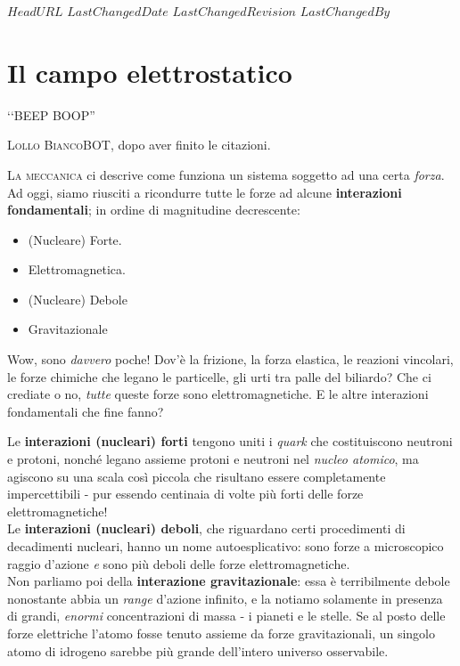 \svnidlong
{$HeadURL$}
{$LastChangedDate$}
{$LastChangedRevision$}
{$LastChangedBy$}

\chapter{Il campo elettrostatico}

\begin{introduction}
‘‘BEEP BOOP''
\begin{flushright}
	\textsc{Lollo BiancoBOT}, dopo aver finito le citazioni. %
\end{flushright}
\end{introduction}
\lettrine[findent=1pt, nindent=0pt]{L}{a meccanica} ci descrive come funziona un sistema soggetto ad una certa \textit{forza}. Ad oggi, siamo riusciti a ricondurre tutte le forze ad alcune \textbf{interazioni fondamentali}; in ordine di magnitudine decrescente:
 \begin{itemize}
 	\item (Nucleare) Forte.
 	\item Elettromagnetica.
 	\item (Nucleare) Debole
 	\item Gravitazionale
 \end{itemize}
 Wow, sono \textit{davvero} poche! Dov'è la frizione, la forza elastica, le reazioni vincolari, le forze chimiche che legano le particelle, gli urti tra palle del biliardo? Che ci crediate o no, \textit{tutte} queste forze sono elettromagnetiche. E le altre interazioni fondamentali che fine fanno?

Le \textbf{interazioni (nucleari) forti} tengono uniti i \textit{quark} che costituiscono neutroni e protoni, nonché legano assieme protoni e neutroni nel \textit{nucleo atomico}, ma agiscono su una scala così piccola che risultano essere completamente impercettibili - pur essendo centinaia di volte più forti delle forze elettromagnetiche!\\
Le \textbf{interazioni (nucleari) deboli}, che riguardano certi procedimenti di decadimenti nucleari, hanno un nome autoesplicativo: sono forze a microscopico raggio d'azione \textit{e} sono più deboli delle forze elettromagnetiche.\\
Non parliamo poi della \textbf{interazione gravitazionale}: essa è terribilmente debole nonostante abbia un \textit{range} d'azione infinito, e la notiamo solamente in presenza di grandi, \textit{enormi} concentrazioni di massa - i pianeti e le stelle. Se al posto delle forze elettriche l'atomo fosse tenuto assieme da forze gravitazionali, un singolo atomo di idrogeno sarebbe più grande dell'intero universo osservabile.

